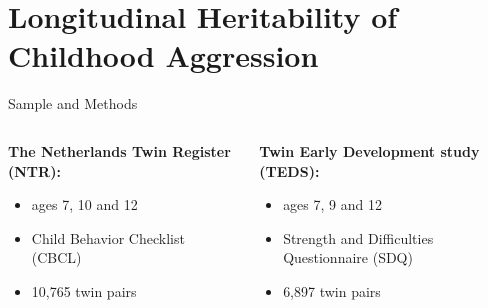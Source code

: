 \documentclass{beamer}
\begin{document}
  \section{Longitudinal Heritability of Childhood Aggression}

  \begin{frame}[t]{Sample and Methods}
    \begin{columns}
      \begin{column}{0.5\textwidth}
        \textbf{The Netherlands Twin Register (NTR):}\\
        \begin{itemize}
          \item ages 7, 10 and 12
          \item Child Behavior Checklist (CBCL)
          \item 10,765 twin pairs
        \end{itemize}
      \end{column}
      \begin{column}{0.5\textwidth}
        \textbf{Twin Early Development study (TEDS):}\\
        \begin{itemize}
          \item ages 7, 9 and 12
          \item Strength and Difficulties Questionnaire (SDQ)
          \item 6,897 twin pairs
        \end{itemize}
      \end{column}
    \end{columns}
    \begin{center}
      \scalebox{0.5}{}
    \end{center}
  \end{frame}
\end{document}
